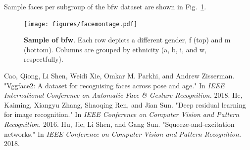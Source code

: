 Sample faces per subgroup of the \gls{bfw} dataset are shown in Fig.~\ref{fig:montage:app}.
\begin{figure}[h!]
\vspace{-2mm}
    \centering
    \texttt{[image: figures/facemontage.pdf]}
    \caption{\textbf{Sample of \gls{bfw}}. Each row depicts a different gender, \gls{f} (top) and \gls{m} (bottom). Columns are grouped by ethnicity (\ie \gls{a}, \gls{b}, \gls{i}, and \gls{w}, respectfully).}
    \label{fig:montage:app}
    \vspace{-1mm}
\end{figure}
{
\scriptsize
\begin{thebibliography}{widest entry}
  Cao, Qiong, Li Shen, Weidi Xie, Omkar M. Parkhi, and Andrew Zisserman. "Vggface2: A dataset for recognising faces across pose and age." In \textit{IEEE International Conference on Automatic Face \& Gesture Recognition.} 2018.
   He, Kaiming, Xiangyu Zhang, Shaoqing Ren, and Jian Sun. "Deep residual learning for image recognition." In \textit{IEEE Conference on Computer Vision and Pattern Recognition.} 2016.
  Hu, Jie, Li Shen, and Gang Sun. "Squeeze-and-excitation networks." In \textit{IEEE Conference on Computer Vision and Pattern Recognition.} 2018.
\end{thebibliography}
}

